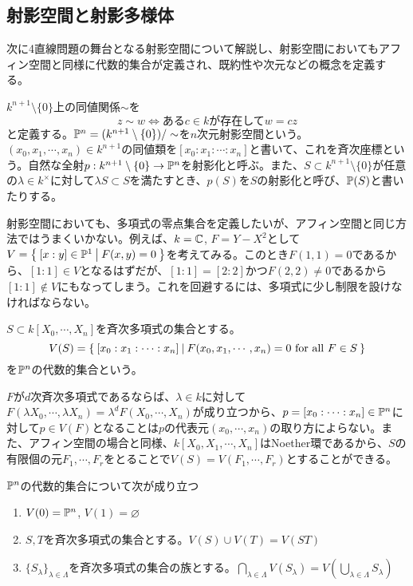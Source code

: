 \documentclass{ltjsreport}
\begin{document}
\subsection{射影空間と射影多様体}

次に4直線問題の舞台となる射影空間について解説し、射影空間においてもアフィン空間と同様に代数的集合が定義され、既約性や次元などの概念を定義する。

\begin{defin}
  $k^{n+1}\setminus\{0\}$上の同値関係$\sim$を
  \[
  z\sim w\Leftrightarrow \text{ある$c\in k$が存在して}w=cz  
  \]
  と定義する。$\mathbb{P}^n=(k^{n+1}\setminus\{0\})/\sim$を$n$次元射影空間という。$(x_0,x_1,\cdots,x_n)\in k^{n+1}$の同値類を$[x_0:x_1:\cdots:x_n]$と書いて、これを斉次座標という。自然な全射$p:k^{n+1}\setminus\{0\}\rightarrow \mathbb{P}^n$を射影化と呼ぶ。また、$S\subset k^{n+1}\setminus\{0\}$が任意の$\lambda\in k^\times $に対して$\lambda S\subset S$を満たすとき、$p(S)$を$S$の射影化と呼び、$\mathbb{P}(S)$と書いたりする。
\end{defin}

射影空間においても、多項式の零点集合を定義したいが、アフィン空間と同じ方法ではうまくいかない。例えば、$k=\mathbb{C}$, $F=Y-X^2$として$V=\left\{\:[x:y]\in\mathbb{P}^1\:\middle|\:F(x,y)=0\:\right\}$を考えてみる。このとき$F(1,1)=0$であるから、$[1:1]\in V$となるはずだが、$[1:1]=[2:2]$かつ$F(2,2)\neq 0$であるから$[1:1]\notin V$にもなってしまう。これを回避するには、多項式に少し制限を設けなければならない。

\begin{defin}
  $S\subset k[X_0,\cdots,X_n]$を斉次多項式の集合とする。
  \[
  V(S)=\left\{\:[x_0:x_1:\cdots:x_n]\:\middle|\:F(x_0,x_1,\cdots,x_n)=0\text{ for all }F\in S\:\right\}  
  \]
  を$\mathbb{P}^n$の代数的集合という。
\end{defin}

$F$が$d$次斉次多項式であるならば、$\lambda\in k$に対して$F(\lambda X_0,\cdots,\lambda X_n)=\lambda^dF(X_0,\cdots,X_n)$が成り立つから、$p=[x_0:\cdots:x_n]\in \mathbb{P}^n$に対して$p\in V(F)$となることは$p$の代表元$(x_0,\cdots,x_n)$の取り方によらない。また、アフィン空間の場合と同様、$k[X_0,X_1,\cdots,X_n]$はNoether環であるから、$S$の有限個の元$F_1,\cdots,F_r$をとることで$V(S)=V(F_1,\cdots,F_r)$とすることができる。

\begin{prop}\label{zariski_for_proj}
  $\mathbb{P}^n$の代数的集合について次が成り立つ
  \begin{enumerate}
    \item $V(0)=\mathbb{P}^n$, $V(1)=\varnothing$
    \item $S,T$を斉次多項式の集合とする。$V(S)\cup V(T)=V(ST)$
    \item $\{S_\lambda\}_{\lambda\in\Lambda}$を斉次多項式の集合の族とする。$\bigcap_{\lambda\in\Lambda}V(S_\lambda)=V(\bigcup_{\lambda\in\Lambda}S_\lambda)$
  \end{enumerate}
\end{prop}
\end{document}
